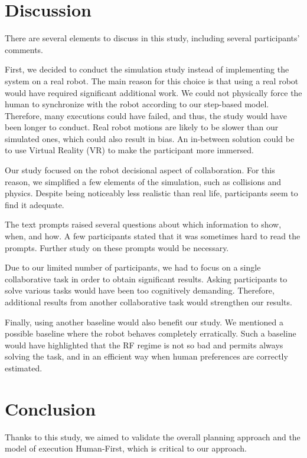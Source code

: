 \section{Discussion}


There are several elements to discuss in this study, including several participants' comments.

First, we decided to conduct the simulation study instead of implementing the system on a real robot. The main reason for this choice is that using a real robot would have required significant additional work. We could not physically force the human to synchronize with the robot according to our step-based model. Therefore, many executions could have failed, and thus, the study would have been longer to conduct. Real robot motions are likely to be slower than our simulated ones, which could also result in bias. An in-between solution could be to use Virtual Reality (VR) to make the participant more immersed.

Our study focused on the robot decisional aspect of collaboration. For this reason, we simplified a few elements of the simulation, such as collisions and physics. Despite being noticeably less realistic than real life, participants seem to find it adequate. 

The text prompts raised several questions about which information to show, when, and how. A few participants stated that it was sometimes hard to read the prompts. Further study on these prompts would be necessary.

Due to our limited number of participants, we had to focus on a single collaborative task in order to obtain significant results. Asking participants to solve various tasks would have been too cognitively demanding. Therefore, additional results from another collaborative task would strengthen our results. 

Finally, using another baseline would also benefit our study. We mentioned a possible baseline where the robot behaves completely erratically. Such a baseline would have highlighted that the RF regime is not so bad and permits always solving the task, and in an efficient way when human preferences are correctly estimated.

\section{Conclusion}

Thanks to this study, we aimed to validate the overall planning approach and the model of execution Human-First, which is critical to our approach. 

